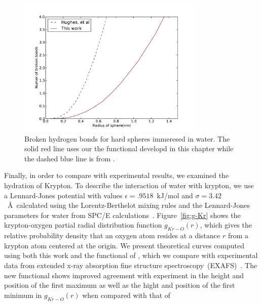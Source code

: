 \begin{figure}
\begin{center}
\includegraphics[width=3.5in]{figs/sphere-broken-HB}
\end{center}
\caption{Broken hydrogen bonds for hard spheres immeresed in water.
  The solid red line uses our the functional developd in this chapter
  while the dashed blue line is from
  \hughesetal.}
\label{fig:spheres-broken-HB}
\end{figure}

Finally, in order to compare with experimental results, we examined
the hydration of Krypton.  To describe the interaction of water with
krypton, we use a Lennard-Jones potential with values $\epsilon =
.9518$~kJ/mol and $\sigma = 3.42$~\AA\ calculated using the
Lorentz-Berthelot mixing rules and the Lennard-Jones parameters for
water from SPC/E
calculations~\cite{paschek2004temperature}. Figure~\ref{fig:g-Kr}
shows the krypton-oxygen partial radial distribution function
$g_{Kr-O}(r)$, which gives the relative probability density that an
oxygen atom resides at a distance $r$ from a krypton atom centered at
the origin.  We present theoretical curves computed using both this
work and the functional of \hughesetal, which we compare with
experimental data from extended x-ray absorption fine structure
spectroscopy~(EXAFS)~\cite{bowron1998hydrophobic}.  The new functional
shows improved agreement with experiment in the height and position
of the first maximum as well as the hight and position of the first
minimum in $g_{Kr-O}(r)$ when compared with that of \hughesetal \



